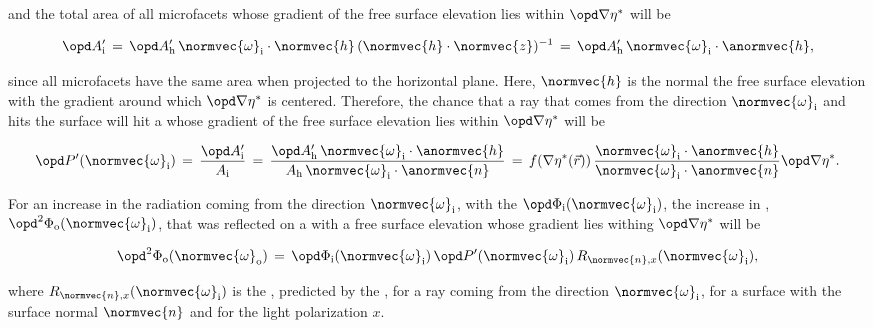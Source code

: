 {and the total area of all microfacets whose gradient of the free surface elevation lies within $\opd\nabla\eta^*$ will be

\begin{equation}
\opd A'_{\text{i}} \,=\, \opd A'_{\text{h}}\,\normvec{\omega}_{\text{i}}\cdot\normvec{h}\,(\normvec{h}\cdot\normvec{z})^{-1} \,=\, \opd A'_{\text{h}}\,\normvec{\omega}_{\text{i}}\cdot\anormvec{h},
\end{equation}

since all microfacets have the same area when projected to the horizontal plane. Here, $\normvec{h}$ is the normal the free surface elevation with the gradient around which $\opd\nabla\eta^*$ is centered. Therefore, the chance that a ray that comes from the direction $\normvec{\omega}_{\text{i}}$ and hits the surface will hit a \microfacet whose gradient of the free surface elevation lies within $\opd\nabla\eta^*$ will be

\begin{equation} \label{eq:gradient_restricted_reflection_probability}
\opd P'(\normvec{\omega}_{\text{i}}) \,=\, \frac{\opd A'_{\text{i}}}{A_{\text{i}}} \,=\, \frac{\opd A'_{\text{h}}\,\normvec{\omega}_{\text{i}}\cdot\anormvec{h}}{A_{\text{h}}\,\normvec{\omega}_{\text{i}}\cdot\anormvec{n}} \,=\, f(\nabla\eta^*(\vec{r}))\,\frac{\normvec{\omega}_{\text{i}}\cdot\anormvec{h}}{\normvec{\omega}_{\text{i}}\cdot\anormvec{n}}\opd \nabla\eta^*.
\end{equation}

For an increase in the radiation coming from the direction $\normvec{\omega}_{\text{i}}$, with the  $\opd \Phi_{\text{i}}(\normvec{\omega}_{\text{i}})$, the increase in , $\opd^2 \Phi_{\text{o}}(\normvec{\omega}_{\text{i}})$, that was reflected on a \microfacet with a free surface elevation whose gradient lies withing $\opd\nabla\eta^*$ will be

\begin{equation} \label{eq:gradient_restricted_reflected_flux}
\opd^2 \Phi_{\text{o}}(\normvec{\omega}_{\text{o}}) \,=\, \opd \Phi_{\text{i}}(\normvec{\omega}_{\text{i}})\,\opd P'(\normvec{\omega}_{\text{i}})\,R_{\normvec{n},x}(\normvec{\omega}_{\text{i}}),
\end{equation}

where $R_{\normvec{n},x}(\normvec{\omega}_{\text{i}})$ is the , predicted by the , for a ray coming from the direction $\normvec{\omega}_{\text{i}}$, for a surface with the surface normal $\normvec{n}$ and for the light polarization $x$.

}
